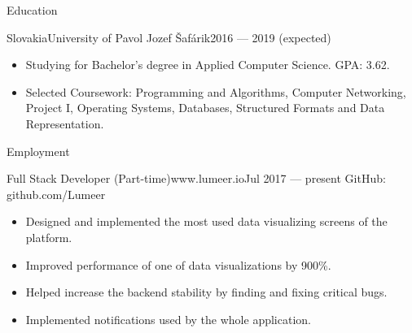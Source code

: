 \documentclass[]{style}
\begin{document}
	\makeheader
	
	\begin{cvsection}{Education}
		\begin{cvsubsection}{Slovakia}{University of Pavol Jozef Šafárik}{2016 — 2019 (expected)}
			\begin{itemize}
				\item Studying for Bachelor's degree in Applied Computer Science. GPA: 3.62.
				\item Selected Coursework: Programming and Algorithms, Computer Networking, Project I, Operating Systems, Databases, Structured Formats and Data Representation.
			\end{itemize}
		\end{cvsubsection}
	\end{cvsection}

	\begin{cvsection}{Employment}
		\begin{cvsubsection}{Full Stack Developer (Part-time)}{www.lumeer.io}{Jul 2017 — present}
			GitHub: github.com/Lumeer
			\begin{itemize}
				\item Designed and implemented the most used data visualizing screens of the platform.
				\item Improved performance of one of data visualizations by 900\%.
				\item Helped increase the backend stability by finding and fixing critical bugs.
				\item Implemented notifications used by the whole application.
			\end{itemize}
		\end{cvsubsection}
	\end{cvsection}
	
\end{document}
